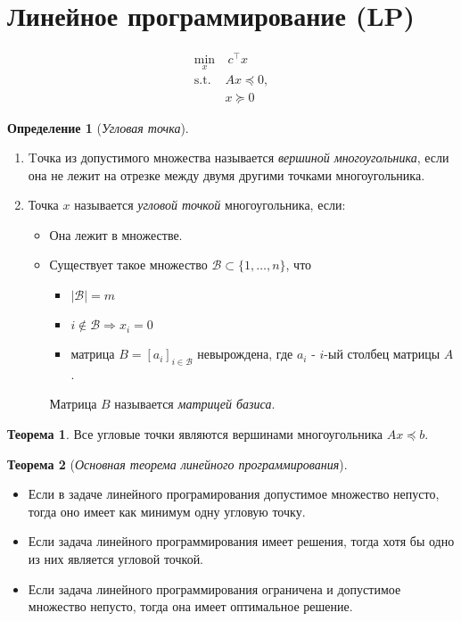\documentclass[11pt,a4paper]{report}
\theoremstyle{definition}
\theoremstyle{definition}
\newtheorem{theorem}{Теорема}[section]
\theoremstyle{definition}
\newtheorem*{definition}{Определение}
\begin{document}
	\section{Линейное программирование (LP)}
	\begin{align*}
		\min_{x}&\ c^\top x\\
		\text{s.t. }& Ax \preceq 0,\\
		& x \succeq 0
	\end{align*}
	\begin{definition}[\textit{Угловая точка}]$  $
		\begin{enumerate}
			\item Tочка из допустимого множества называется \textit{вершиной многоугольника}, если она не лежит на отрезке между двумя другими точками многоугольника.
			\item Точка $x$ называется \textit{угловой точкой} многоугольника, если:
			\begin{itemize}[$\diamond$]
				\item Она лежит в множестве.
				\item Существует такое множество $\mathcal{B} \subset \{1, \dots, n \}$, что 
				\begin{itemize}
			  	\item $|\mathcal{B}| = m$
			  	\item $i \notin \mathcal{B} \Rightarrow x_i = 0$
			  	\item матрица $B = [a_i]_{i \in \mathcal{B}}$ невырождена, где $a_i$ - $i$-ый столбец матрицы $A$.
			   \end{itemize}
		   Матрица $B$ называется \textit{матрицей базиса}.
			\end{itemize}
		\end{enumerate}
	\end{definition}
	\begin{theorem}
		Все угловые точки являются вершинами многоугольника $ Ax \preceq b $.
	\end{theorem}
	\begin{theorem}[\textit{Основная теорема линейного программирования}]$  $
		\begin{itemize}[$\diamond$]
			\item Если в задаче линейного програмирования допустимое множество непусто, тогда оно имеет как минимум одну угловую точку.
			\item Если задача линейного программирования имеет решения, тогда хотя бы одно из них является угловой точкой.
			\item Если задача линейного программирования ограничена и допустимое множество непусто, тогда она имеет оптимальное решение.
		\end{itemize}
	\end{theorem}
\end{document}
